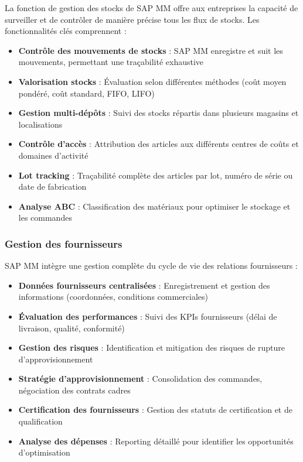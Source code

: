 \documentclass[12pt,a4paper,oneside]{report}
\begin{document}
La fonction de gestion des stocks de SAP MM offre aux entreprises la capacité de surveiller et de contrôler de manière précise 
tous les flux de stocks. Les fonctionnalités clés comprennent :

\begin{itemize}[label=---, itemsep=0.15em]
	\item \textbf{Contrôle des mouvements de stocks} : SAP MM enregistre et suit les mouvements, permettant une traçabilité exhaustive
	\item \textbf{Valorisation stocks} : Évaluation selon différentes méthodes (coût moyen pondéré, coût standard, FIFO, LIFO)
	\item \textbf{Gestion multi-dépôts} : Suivi des stocks répartis dans plusieurs magasins et localisations
	\item \textbf{Contrôle d'accès} : Attribution des articles aux différents centres de coûts et domaines d'activité
	\item \textbf{Lot tracking} : Traçabilité complète des articles par lot, numéro de série ou date de fabrication
	\item \textbf{Analyse ABC} : Classification des matériaux pour optimiser le stockage et les commandes
\end{itemize}

\subsubsection{Gestion des fournisseurs}\label{ch2:mm-fourni}

SAP MM intègre une gestion complète du cycle de vie des relations fournisseurs :

\begin{itemize}[label=\textbullet, itemsep=0.2em]
	\item \textbf{Données fournisseurs centralisées} : Enregistrement et gestion des informations (coordonnées, conditions commerciales)
	\item \textbf{Évaluation des performances} : Suivi des KPIs fournisseurs (délai de livraison, qualité, conformité)
	\item \textbf{Gestion des risques} : Identification et mitigation des risques de rupture d'approvisionnement
	\item \textbf{Stratégie d'approvisionnement} : Consolidation des commandes, négociation des contrats cadres
	\item \textbf{Certification des fournisseurs} : Gestion des statuts de certification et de qualification
	\item \textbf{Analyse des dépenses} : Reporting détaillé pour identifier les opportunités d'optimisation
\end{itemize}
\end{document}
